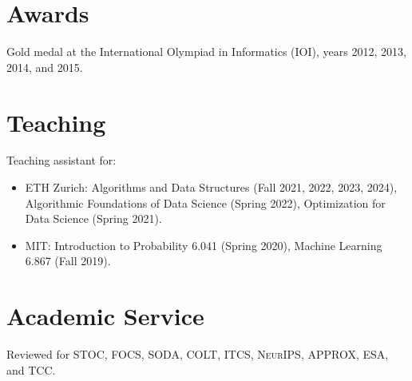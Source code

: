 \documentclass[11pt,a4paper]{article}
\begin{document}
\section*{Awards}
Gold medal at the International Olympiad in Informatics (IOI), years 2012, 2013, 2014, and 2015.

\section*{Teaching}
Teaching assistant for:
\begin{itemize}
  \item {}ETH Zurich: Algorithms and Data Structures (Fall 2021, 2022, 2023, 2024), Algorithmic Foundations of Data Science (Spring 2022), Optimization for Data Science (Spring 2021).
  \item {}MIT: Introduction to Probability 6.041 (Spring 2020), Machine Learning 6.867 (Fall 2019).
\end{itemize}

\section*{Academic Service}
Reviewed for \textsc{STOC}, \textsc{FOCS}, \textsc{SODA}, \textsc{COLT}, \textsc{ITCS}, \textsc{NeurIPS}, \textsc{APPROX}, \textsc{ESA}, and \textsc{TCC}.
\end{document}
